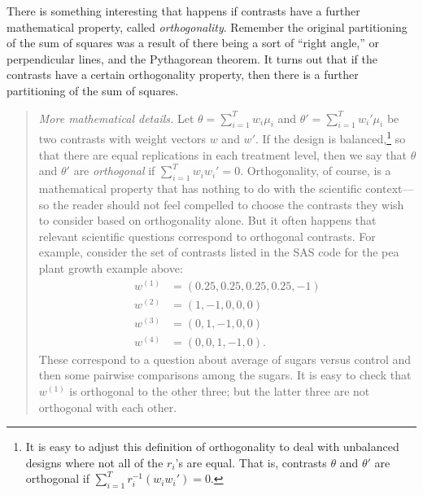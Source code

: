 \documentclass[a4paper, 12pt]{article}
\theoremstyle{plain}
\theoremstyle{definition}
\theoremstyle{remark}
\begin{document}
There is something interesting that happens if contrasts have a further mathematical property, called {\em orthogonality}.  Remember the original partitioning of the sum of squares was a result of there being a sort of ``right angle,'' or perpendicular lines, and the Pythagorean theorem.  It turns out that if the contrasts have a certain orthogonality property, then there is a further partitioning of the sum of squares.  

\begin{quote}
{\em More mathematical details.}  Let $\theta = \sum_{i=1}^T w_i \mu_i$ and $\theta' = \sum_{i=1}^T w_i' \mu_i$ be two contrasts with weight vectors $w$ and $w'$.  If the design is balanced,\footnote{It is easy to adjust this definition of orthogonality to deal with unbalanced designs where not all of the $r_i$'s are equal.  That is, contrasts $\theta$ and $\theta'$ are orthogonal if $\sum_{i=1}^T r_i^{-1} (w_i w_i') = 0$.} so that there are equal replications in each treatment level, then we say that $\theta$ and $\theta'$ are {\em orthogonal} if $\sum_{i=1}^T w_i w_i' = 0$.  Orthogonality, of course, is a mathematical property that has nothing to do with the scientific context---so the reader should not feel compelled to choose the contrasts they wish to consider based on orthogonality alone.  But it often happens that relevant scientific questions correspond to orthogonal contrasts.  For example, consider the set of contrasts listed in the SAS code for the pea plant growth example above:
\begin{align*}
w^{(1)} & = (0.25, 0.25, 0.25, 0.25, -1) \\
w^{(2)} & = (1, -1, 0, 0, 0) \\
w^{(3)} & = (0, 1, -1, 0, 0) \\
w^{(4)} & = (0, 0, 1, -1, 0).
\end{align*}
These correspond to a question about average of sugars versus control and then some pairwise comparisons among the sugars.  It is easy to check that $w^{(1)}$ is orthogonal to the other three; but the latter three are not orthogonal with each other.  


\end{quote}
\end{document}
